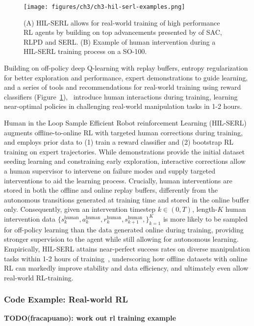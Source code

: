 \begin{figure}
    \centering
    \texttt{[image: figures/ch3/ch3-hil-serl-examples.png]}
    \caption{(A) HIL-SERL allows for real-world training of high performance RL agents by building on top advancements presented by of SAC, RLPD and SERL. (B) Example of human intervention during a HIL-SERL training process on a SO-100.}
    \label{fig:hil-serl-blocks}
\end{figure}

Building on off-policy deep Q-learning with replay buffers, entropy regularization for better exploration and performance, expert demonstrations to guide learning, and a series of tools and recommendations for real-world training using reward classifiers (Figure~\ref{fig:hil-serl-blocks}),~\citet{luoPreciseDexterousRobotic2024} introduce human interactions during training, learning near-optimal policies in challenging real-world manipulation tasks in 1-2 hours.

Human in the Loop Sample Efficient Robot reinforcement Learning (HIL-SERL)~\citep{luoPreciseDexterousRobotic2024} augments offline-to-online RL with targeted human corrections during training, and employs prior data to (1) train a reward classifier and (2) bootstrap RL training on expert trajectories.
While demonstrations provide the initial dataset seeding learning and constraining early exploration, interactive corrections allow a human supervisor to intervene on failure modes and supply targeted interventions to aid the learning process.
Crucially, human interventions are stored in both the offline and online replay buffers, differently from the autonomous transitions generated at training time and stored in the online buffer only.
Consequently, given an intervention timestep \( k \in (0, T) \), length-\(K\) human intervention data \( \{ s^{\text{human}}_k, a^{\text{human}}_k, r^{\text{human}}_k, s^{\text{human}}_{k+1},\}_{k=1}^K \) is more likely to be sampled for off-policy learning than the data generated online during training, providing stronger supervision to the agent while still allowing for autonomous learning.
Empirically, HIL-SERL attains near-perfect success rates on diverse manipulation tasks within 1-2 hours of training~\citep{luoPreciseDexterousRobotic2024}, underscoring how offline datasets with online RL can markedly improve stability and data efficiency, and ultimately even allow real-world RL-training.

\subsubsection{Code Example: Real-world RL}
\textbf{TODO(fracapuano): work out rl training example}

